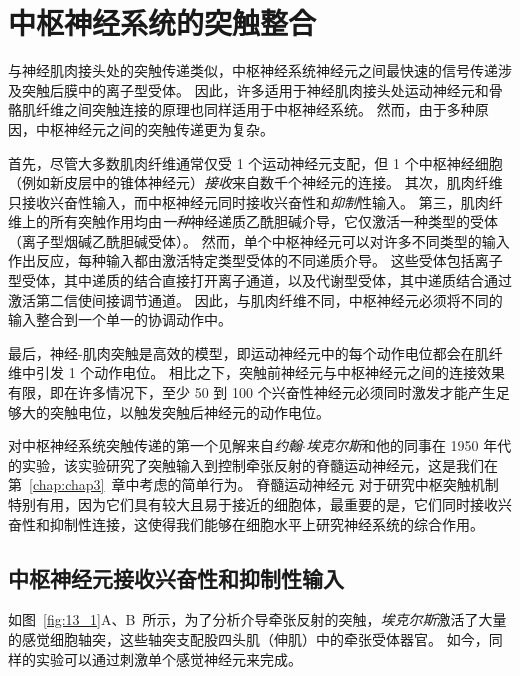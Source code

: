 \chapter{中枢神经系统的突触整合} \label{chap:chap13}

与神经肌肉接头处的突触传递类似，中枢神经系统神经元之间最快速的信号传递涉及突触后膜中的离子型受体。
因此，许多适用于神经肌肉接头处运动神经元和骨骼肌纤维之间突触连接的原理也同样适用于中枢神经系统。
然而，由于多种原因，中枢神经元之间的突触传递更为复杂。


首先，尽管大多数肌肉纤维通常仅受 1 个运动神经元支配，但 1 个中枢神经细胞（例如新皮层中的锥体神经元）\textit{接收}来自数千个神经元的连接。
其次，肌肉纤维只接收兴奋性输入，而中枢神经元同时接收兴奋性和\textit{抑制}性输入。
第三，肌肉纤维上的所有突触作用均由\textit{一种}神经递质乙酰胆碱介导，它仅激活一种类型的受体（离子型烟碱乙酰胆碱受体）。
然而，单个中枢神经元可以对许多不同类型的输入作出反应，每种输入都由激活特定类型受体的不同递质介导。
这些受体包括离子型受体，其中递质的结合直接打开离子通道，以及代谢型受体，其中递质结合通过激活第二信使间接调节通道。
因此，与肌肉纤维不同，中枢神经元必须将不同的输入整合到一个单一的协调动作中。


最后，神经-肌肉突触是高效的模型，即运动神经元中的每个动作电位都会在肌纤维中引发 1 个动作电位。
相比之下，突触前神经元与中枢神经元之间的连接效果有限，即在许多情况下，至少 50 到 100 个兴奋性神经元必须同时激发才能产生足够大的突触电位，以触发突触后神经元的动作电位。


对中枢神经系统突触传递的第一个见解来自\textit{约翰$\cdot$埃克尔斯}和他的同事在 1950 年代的实验，该实验研究了突触输入到控制牵张反射的脊髓运动神经元，这是我们在第~\ref{chap:chap3}~章中考虑的简单行为。
脊髓运动神经元 对于研究中枢突触机制特别有用，因为它们具有较大且易于接近的细胞体，最重要的是，它们同时接收兴奋性和抑制性连接，这使得我们能够在细胞水平上研究神经系统的综合作用。



\section{中枢神经元接收兴奋性和抑制性输入}

如图~\ref{fig:13_1}A、B~所示，为了分析介导牵张反射的突触，\textit{埃克尔斯}激活了大量的感觉细胞轴突，这些轴突支配股四头肌（伸肌）中的牵张受体器官。
如今，同样的实验可以通过刺激单个感觉神经元来完成。


